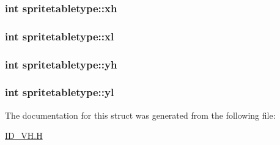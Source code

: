 \label{structspritetabletype_ae0c14da0461f33dd67c94e9be6787624}
\hypertarget{structspritetabletype_a4f58c2b1994e93a39a30a91034698c69}{
\subsubsection[{xh}]{\setlength{\rightskip}{0pt plus 5cm}int {\bf spritetabletype::xh}}}
\label{structspritetabletype_a4f58c2b1994e93a39a30a91034698c69}
\hypertarget{structspritetabletype_a18d810e53225f452c96316f4a1986968}{
\subsubsection[{xl}]{\setlength{\rightskip}{0pt plus 5cm}int {\bf spritetabletype::xl}}}
\label{structspritetabletype_a18d810e53225f452c96316f4a1986968}
\hypertarget{structspritetabletype_a5a64e2ba0001e6558290ffbff9953da2}{
\subsubsection[{yh}]{\setlength{\rightskip}{0pt plus 5cm}int {\bf spritetabletype::yh}}}
\label{structspritetabletype_a5a64e2ba0001e6558290ffbff9953da2}
\hypertarget{structspritetabletype_a42732eac474e99136a774fa7700b05a7}{
\subsubsection[{yl}]{\setlength{\rightskip}{0pt plus 5cm}int {\bf spritetabletype::yl}}}
\label{structspritetabletype_a42732eac474e99136a774fa7700b05a7}


The documentation for this struct was generated from the following file:\begin{DoxyCompactItemize}
\item 
\hyperlink{ID__VH_8H}{ID\_\-VH.H}\end{DoxyCompactItemize}
